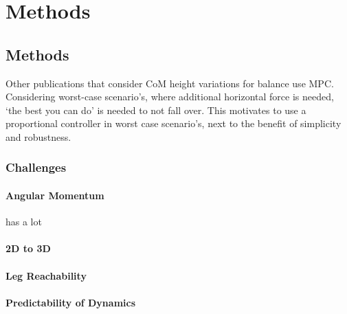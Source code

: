 \chapter{Methods}
\section{Methods}
Other publications that consider \ac{CoM} height variations for balance use \ac{MPC}. Considering worst-case scenario's, where additional horizontal force is needed, `the best you can do' is needed to not fall over. This motivates to use a proportional controller in worst case scenario's, next to the benefit of simplicity and robustness.

\subsection{Challenges}
\subsubsection{Angular Momentum} has a lot
\subsubsection{2D to 3D}
\subsubsection{Leg Reachability}
\subsubsection{Predictability of Dynamics}

